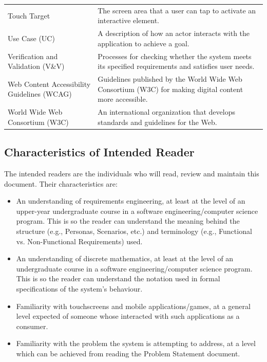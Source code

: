 \documentclass[12pt]{article}
\begin{document}
\begin{longtable}{@{}p{} p{}@{}}
Touch Target &
The screen area that a user can tap to activate an interactive element. \\

Use Case (UC) &
A description of how an actor interacts with the application to achieve a goal. \\

Verification and Validation (V\&V) &
Processes for checking whether the system meets its specified requirements and satisfies user needs. \\

Web Content Accessibility Guidelines (WCAG) &
Guidelines published by the World Wide Web Consortium (W3C) for making digital content more accessible. \\

World Wide Web Consortium (W3C) &
An international organization that develops standards and guidelines for the Web. \\

\end{longtable}

\subsection{Characteristics of Intended Reader} \label{sec_IntendedReader}

The intended readers are the individuals who will read, review and maintain this document. Their characteristics are:
\begin{itemize}
\item An understanding of requirements engineering, at least at the level of an upper-year undergraduate course in a software
engineering/computer science program. This is so the reader can understand the meaning behind the structure (e.g., Personas, Scenarios, etc.)
and terminology (e.g., Functional vs. Non-Functional Requirements) used.
\item An understanding of discrete mathematics, at least at the level of an undergraduate course in a software engineering/computer science program.
This is so the reader can understand the notation used in formal specifications of the system's behaviour.
\item Familiarity with touchscreens and mobile applications/games, at a general level expected of someone whose interacted
with such applications as a consumer.
\item Familiarity with the problem the system is attempting to address, at a level which can be achieved from reading
the Problem Statement document.
\end{itemize}
\end{document}
